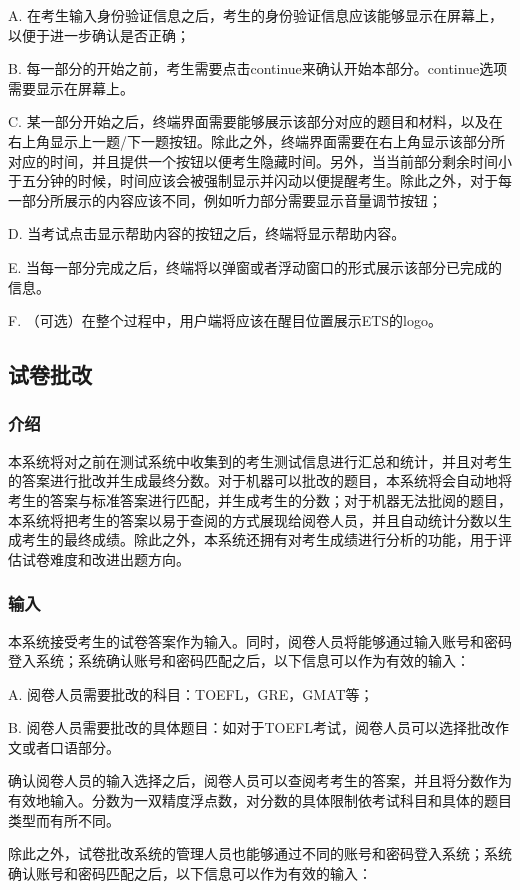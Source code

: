 A. 在考生输入身份验证信息之后，考生的身份验证信息应该能够显示在屏幕上，以便于进一步确认是否正确；

B. 每一部分的开始之前，考生需要点击continue来确认开始本部分。continue选项需要显示在屏幕上。

C. 某一部分开始之后，终端界面需要能够展示该部分对应的题目和材料，以及在右上角显示上一题/下一题按钮。除此之外，终端界面需要在右上角显示该部分所对应的时间，并且提供一个按钮以便考生隐藏时间。另外，当当前部分剩余时间小于五分钟的时候，时间应该会被强制显示并闪动以便提醒考生。除此之外，对于每一部分所展示的内容应该不同，例如听力部分需要显示音量调节按钮；

D. 当考试点击显示帮助内容的按钮之后，终端将显示帮助内容。

E. 当每一部分完成之后，终端将以弹窗或者浮动窗口的形式展示该部分已完成的信息。

F. （可选）在整个过程中，用户端将应该在醒目位置展示ETS的logo。

\subsection{试卷批改}

\subsubsection{介绍}
本系统将对之前在测试系统中收集到的考生测试信息进行汇总和统计，并且对考生的答案进行批改并生成最终分数。对于机器可以批改的题目，本系统将会自动地将考生的答案与标准答案进行匹配，并生成考生的分数；对于机器无法批阅的题目，本系统将把考生的答案以易于查阅的方式展现给阅卷人员，并且自动统计分数以生成考生的最终成绩。除此之外，本系统还拥有对考生成绩进行分析的功能，用于评估试卷难度和改进出题方向。

\subsubsection{输入}
本系统接受考生的试卷答案作为输入。同时，阅卷人员将能够通过输入账号和密码登入系统；系统确认账号和密码匹配之后，以下信息可以作为有效的输入：

A. 阅卷人员需要批改的科目：TOEFL，GRE，GMAT等；

B. 阅卷人员需要批改的具体题目：如对于TOEFL考试，阅卷人员可以选择批改作文或者口语部分。

确认阅卷人员的输入选择之后，阅卷人员可以查阅考考生的答案，并且将分数作为有效地输入。分数为一双精度浮点数，对分数的具体限制依考试科目和具体的题目类型而有所不同。

除此之外，试卷批改系统的管理人员也能够通过不同的账号和密码登入系统；系统确认账号和密码匹配之后，以下信息可以作为有效的输入：

